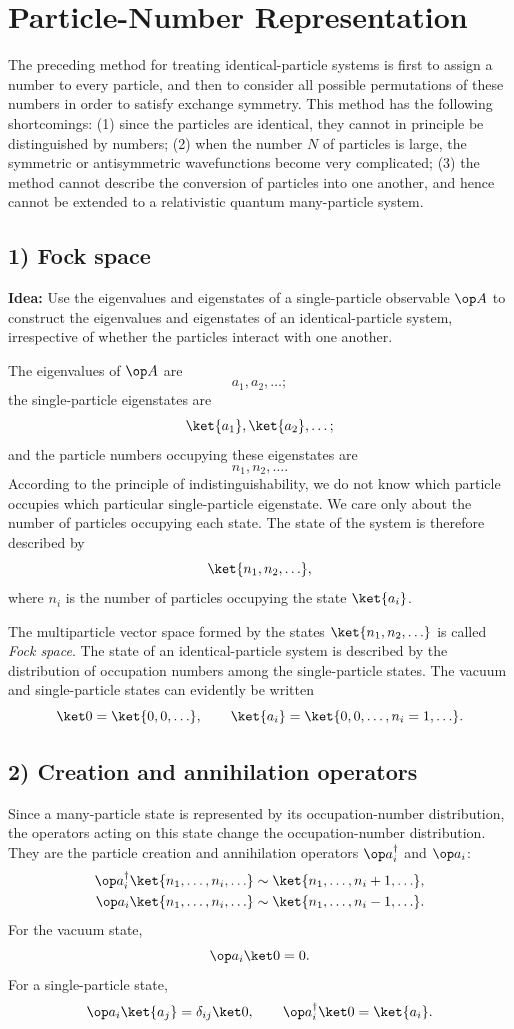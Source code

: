 \section{Particle-Number Representation}
The preceding method for treating identical-particle systems is first to assign a number to every particle, and then to consider all possible permutations of these numbers in order to satisfy exchange symmetry. This method has the following shortcomings: (1) since the particles are identical, they cannot in principle be distinguished by numbers; (2) when the number $N$ of particles is large, the symmetric or antisymmetric wavefunctions become very complicated; (3) the method cannot describe the conversion of particles into one another, and hence cannot be extended to a relativistic quantum many-particle system.

\subsection*{1) Fock space}
\textbf{Idea:} Use the eigenvalues and eigenstates of a single-particle observable $\op A$ to construct the eigenvalues and eigenstates of an identical-particle system, irrespective of whether the particles interact with one another.

The eigenvalues of $\op A$ are
\[a_1,a_2,\ldots;\]
the single-particle eigenstates are
\[\ket{a_1},\ket{a_2},\ldots;\]
and the particle numbers occupying these eigenstates are
\[n_1,n_2,\ldots.\]
According to the principle of indistinguishability, we do not know which particle occupies which particular single-particle eigenstate. We care only about the number of particles occupying each state. The state of the system is therefore described by
\[\ket{n_1,n_2,\ldots},\]
where $n_i$ is the number of particles occupying the state $\ket{a_i}$.

The multiparticle vector space formed by the states $\ket{n_1,n_2,\ldots}$ is called \emph{Fock space}. The state of an identical-particle system is described by the distribution of occupation numbers among the single-particle states. The vacuum and single-particle states can evidently be written
\[\ket 0=\ket{0,0,\ldots},\qquad
\ket{a_i}=\ket{0,0,\ldots,n_i=1,\ldots}.\]

\subsection*{2) Creation and annihilation operators}
Since a many-particle state is represented by its occupation-number distribution, the operators acting on this state change the occupation-number distribution. They are the particle creation and annihilation operators $\op a_i^\dagger$ and $\op a_i$:
\begin{align*}
\op a_i^\dagger\ket{n_1,\ldots,n_i,\ldots}&\sim\ket{n_1,\ldots,n_i+1,\ldots},\\
\op a_i\ket{n_1,\ldots,n_i,\ldots}&\sim\ket{n_1,\ldots,n_i-1,\ldots}.
\end{align*}
For the vacuum state,
\[\op a_i\ket0=0.\]
For a single-particle state,
\[\op a_i\ket{a_j}=\delta_{ij}\ket0,\qquad
\op a_i^\dagger\ket0=\ket{a_i}.\]

